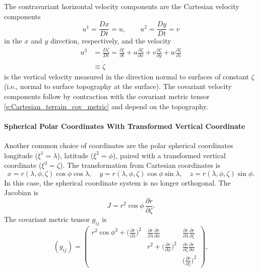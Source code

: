 \documentclass{report}
\begin{document}

The contravariant horizontal velocity components are the Cartesian velocity components 
\[
u^1 = \frac{Dx}{Dt} = u, \qquad u^2 = \frac{Dy}{Dt} = v
\]
in the $x$ and $y$ direction, respectively, and the velocity
\begin{align*}
u^3 & = \frac{D\zeta}{Dt} 
 = \frac{\partial \zeta}{\partial t} + u \frac{\partial \zeta}{\partial x} + v \frac{\partial \zeta}{\partial y} + w \frac{\partial \zeta}{\partial z}\\
 & \equiv \dot \zeta
\end{align*}
is the vertical velocity measured in the direction normal to surfaces of constant $\zeta$ (i.e., normal to surface topography at the surface). The covariant velocity components follow by contraction with the covariant metric tensor \eqref{e:Cartesian_terrain_cov_metric} and depend on the topography.

\paragraph{Spherical Polar Coordinates With Transformed Vertical Coordinate} Another common choice of coordinates are the polar spherical coordinates longitude ($\xi^1 = \lambda$), latitude ($\xi^2 = \phi$), paired with a transformed vertical coordinate ($\xi^3 = \zeta$). 
The transformation from Cartesian coordinates is
\[
x = r(\lambda, \phi, \zeta)\cos\phi\cos\lambda, \quad y=r(\lambda, \phi, \zeta)\cos\phi\sin\lambda, \quad z=r(\lambda, \phi, \zeta)\sin\phi.
\]
In this case, the spherical coordinate system is no longer orthogonal. The Jacobian is \citep{Staniforth03a}
\[
J=  r^2 \cos\phi \, \frac{\partial r}{\partial \zeta}.
\]
The covariant metric tensor $g_{ij}$ is 
\begin{equation}\label{e:spherical_terrain_cov_metric}
    (g_{ij}) = \left(
    \begin{matrix}
    r^2\cos\phi^2 + \big(\frac{\partial r}{\partial \lambda}\big)^2 &
    \frac{\partial r}{\partial \lambda}\frac{\partial r}{\partial \phi}& 
    \frac{\partial r}{\partial \lambda}\frac{\partial r}{\partial \zeta} \\
   & 
   r^2 + \big(\frac{\partial r}{\partial \phi}\big)^2& 
   \frac{\partial r}{\partial \zeta}\frac{\partial r}{\partial \phi} \\
       & & \big(\frac{\partial r}{\partial \zeta}\big)^2
    \end{matrix}
    \right),
\end{equation}
\end{document}
